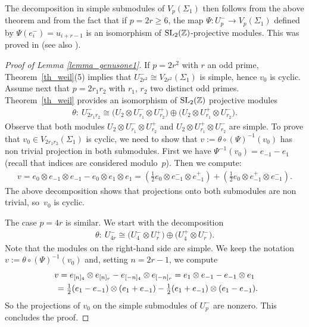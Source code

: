 \documentclass[11pt]{article}
\numberwithin{equation}{section}
\begin{document}
The decomposition in simple submodules of $V_p(\Sigma_1)$ then follows from the above theorem and from the fact that if $p=2r\geq 6$, the map $\Psi\colon U_p^- \rightarrow V_{p}(\Sigma_1)$
defined by $\Psi(e_i^-) = u_{i+r-1}$ is an isomorphism of $\operatorname{SL}_2(\mathbb{Z})$-projective modules. This was proved in \cite{FK} (see also \cite[Theorem~5.1]{Koju1}).

\begin{proof}[Proof of Lemma \ref{lemma_genusone1}]If $p=2r^2$ with $r$ an odd prime, Theorem~\ref{th_weil}(5) implies that $U_{2 r^2}^- \cong V_{2r^2}(\Sigma_1)$ is simple, hence $v_0$ is cyclic. Assume next that $p=2r_1r_2$ with $r_1$, $r_2$ two distinct odd primes. Theorem~\ref{th_weil} provides an isomorphism of $\operatorname{SL}_2(\mathbb{Z})$ projective modules
\begin{gather*} \theta \colon \ U_{2r_1r_2}^- \cong \big(U_2\otimes U_{r_1}^-\otimes U_{r_2}^+\big) \oplus \big(U_2\otimes U_{r_1}^+ \otimes U_{r_2}^-\big).\end{gather*}
Observe that both modules $U_2\otimes U_{r_1}^-\otimes U_{r_2}^+$ and $U_2\otimes U_{r_1}^+ \otimes U_{r_2}^-$ are simple. To prove that $v_0 \in V_{2r_1r_2}(\Sigma_1)$ is cyclic, we need to show that $v:= \theta\circ (\Psi)^{-1} (v_0) $ has non trivial projection in both submodules. First we have $\Psi^{-1}(v_0) = e_{-1} - e_1$ (recall that indices are considered modulo~$p$). Then we compute:
\begin{gather*} v = e_0\otimes e_{-1} \otimes e_{-1} - e_0\otimes e_1\otimes e_1 = \left( \tfrac{1}{2} e_0 \otimes e_{-1}^- \otimes e_{-1}^+ \right) + \left(\tfrac{1}{2} e_0\otimes e_{-1}^+\otimes e_{-1}^- \right).\end{gather*}
The above decomposition shows that projections onto both submodules are non trivial, so~$v_0$ is cyclic.

The case $p=4r$ is similar. We start with the decomposition
\begin{gather*} \theta \colon \ U_{4r}^- \cong \big(U_4^- \otimes U_r^+\big) \oplus \big(U_4^+ \otimes U_r^-\big).\end{gather*}
Note that the modules on the right-hand side are simple. We keep the notation $v:=\theta\circ (\Psi)^{-1}(v_0)$ and, setting $n=2r-1$, we compute
\begin{gather*} v= e_{[n]_4}\otimes e_{[n]_r} - e_{[-n]_4}\otimes e_{[-n]_r} = e_1\otimes e_{-1} - e_{-1}\otimes e_1 \\
\hphantom{v}{} = \tfrac{1}{2}(e_1-e_{-1})\otimes (e_1+e_{-1}) - \tfrac{1}{2}(e_1+e_{-1})\otimes (e_1-e_{-1}).
\end{gather*}
So the projections of $v_0$ on the simple submodules of $U_p^-$ are nonzero. This concludes the proof.
\end{proof}
\end{document}
